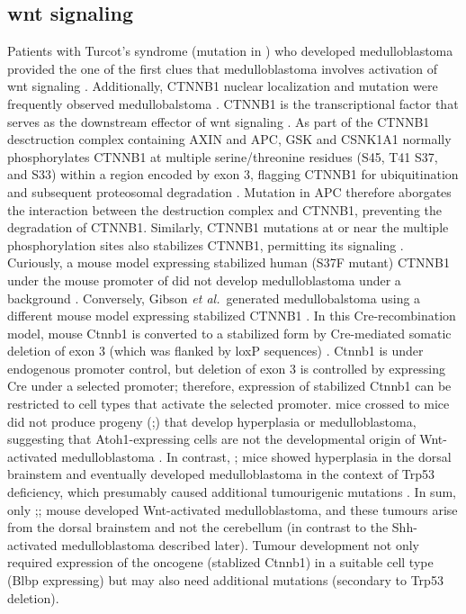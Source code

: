 \subsection{\gls{wnt} signaling}

Patients with Turcot's syndrome (mutation in ) who developed medulloblastoma provided the one of the first clues that medulloblastoma involves activation of \gls{wnt} signaling . Additionally, CTNNB1 nuclear localization and  mutation were frequently observed medullobalstoma . CTNNB1 is the transcriptional factor that serves as the downstream effector of \gls{wnt} signaling . As part of the CTNNB1 desctruction complex containing AXIN and APC, GSK and CSNK1A1 normally phosphorylates CTNNB1 at multiple serine/threonine residues (S45, T41 S37, and S33) within a region encoded by exon 3, flagging CTNNB1 for ubiquitination and subsequent proteosomal degradation . Mutation in APC therefore aborgates the interaction between the destruction complex and CTNNB1, preventing the degradation of CTNNB1. Similarly, CTNNB1 mutations at or near the multiple phosphorylation sites also stabilizes CTNNB1, permitting its signaling . Curiously, a mouse model expressing stabilized human (S37F mutant) CTNNB1 under the mouse promoter of  did not develop medulloblastoma under a \high{-/-} background . Conversely, Gibson \emph{et al.}\ generated medullobalstoma using a different mouse model expressing stabilized CTNNB1 . In this Cre-recombination model, mouse Ctnnb1 is converted to a stabilized form by Cre-mediated somatic deletion of exon 3 (which was flanked by loxP sequences) . Ctnnb1 is under endogenous promoter control, but deletion of exon 3 is controlled by expressing Cre under a selected promoter; therefore, expression of stabilized Ctnnb1 can be restricted to cell types that activate the selected promoter.   mice crossed to  mice did not produce progeny (;) that develop hyperplasia or medulloblastoma, suggesting that Atoh1-expressing cells are not the developmental origin of Wnt-activated medulloblastoma . In contrast, ; mice showed hyperplasia in the dorsal brainstem and eventually developed medulloblastoma in the context of Trp53 deficiency, which presumably caused additional tumourigenic mutations . In sum, only ;; mouse developed Wnt-activated medulloblastoma, and these tumours arise from the dorsal brainstem and not the cerebellum (in contrast to the Shh-activated medulloblastoma described later). Tumour development not only required expression of the oncogene (stablized Ctnnb1) in a suitable cell type (Blbp expressing) but may also need additional mutations (secondary to Trp53 deletion).

